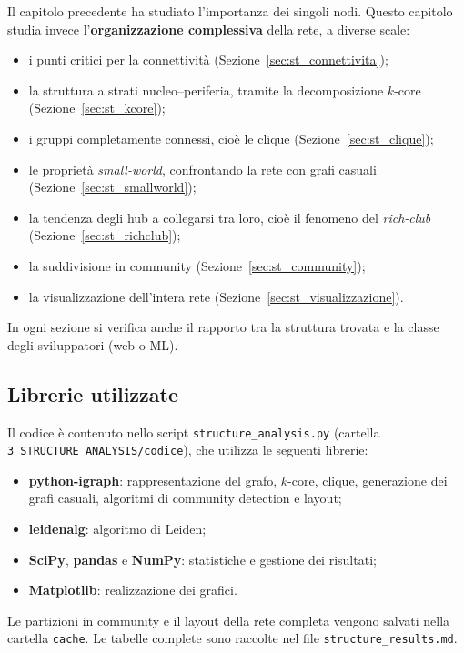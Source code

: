 \documentclass[11pt]{report}
\begin{document}
Il capitolo precedente ha studiato l'importanza dei singoli nodi. Questo capitolo
studia invece l'\textbf{organizzazione complessiva} della rete, a diverse scale:
\begin{itemize}
  \item i punti critici per la connettività (Sezione~\ref{sec:st_connettivita});
  \item la struttura a strati nucleo--periferia, tramite la decomposizione
        $k$-core (Sezione~\ref{sec:st_kcore});
  \item i gruppi completamente connessi, cioè le clique (Sezione~\ref{sec:st_clique});
  \item le proprietà \emph{small-world}, confrontando la rete con grafi casuali
        (Sezione~\ref{sec:st_smallworld});
  \item la tendenza degli hub a collegarsi tra loro, cioè il fenomeno del
        \emph{rich-club} (Sezione~\ref{sec:st_richclub});
  \item la suddivisione in community (Sezione~\ref{sec:st_community});
  \item la visualizzazione dell'intera rete (Sezione~\ref{sec:st_visualizzazione}).
\end{itemize}
In ogni sezione si verifica anche il rapporto tra la struttura trovata e la classe
degli sviluppatori (web o ML).

\subsection{Librerie utilizzate}
{\sloppy Il codice è contenuto nello script \texttt{structure\_analysis.py}
(cartella \texttt{3\_STRUCTURE\_ANALYSIS/codice}), che utilizza le seguenti
librerie:\par}
\begin{itemize}
  \item \textbf{python-igraph}: rappresentazione del grafo, $k$-core, clique,
        generazione dei grafi casuali, algoritmi di community detection e layout;
  \item \textbf{leidenalg}: algoritmo di Leiden;
  \item \textbf{SciPy}, \textbf{pandas} e \textbf{NumPy}: statistiche e gestione
        dei risultati;
  \item \textbf{Matplotlib}: realizzazione dei grafici.
\end{itemize}
Le partizioni in community e il layout della rete completa vengono salvati nella
cartella \texttt{cache}. Le tabelle complete sono raccolte nel file
\texttt{structure\_results.md}.
\end{document}
